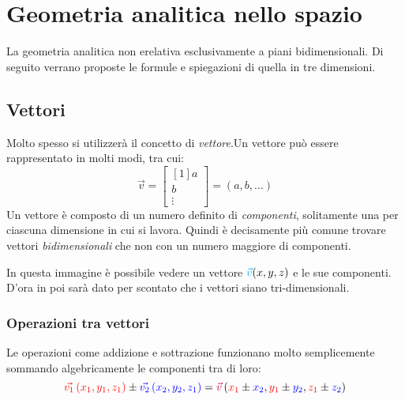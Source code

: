 
\section{Geometria analitica nello spazio}
La geometria analitica non erelativa esclusivamente a piani bidimensionali. Di seguito verrano 
proposte le formule e spiegazioni di quella in tre dimensioni.
\subsection{Vettori}
Molto spesso si utilizzerà il concetto di \emph{vettore}.Un vettore può essere rappresentato in 
molti modi, tra cui:
\begin{equation*}
  \vec{v} = 
  \begin{bmatrix}[1]
    a\\b\\\vdots
  \end{bmatrix} = 
  (a, b, \dots)
\end{equation*}
Un vettore è composto di un numero definito di \emph{componenti}, solitamente una per ciascuna
dimensione in cui si lavora. Quindi è decisamente più comune trovare vettori \emph{bidimensionali}
che non con un numero maggiore di componenti.
\begin{center}
\end{center}
In questa immagine è possibile vedere un vettore $\mathcolor{cyan}{\vec{v}}(x,y,z)$ e le sue 
componenti.\\[\baselineskip]
D'ora in poi sarà dato per scontato che i vettori siano tri-dimensionali.

\subsubsection{Operazioni tra vettori}
Le operazioni come addizione e sottrazione funzionano molto semplicemente sommando algebricamente
le componenti tra di loro:
\begin{equation*}
  \mathcolor{red}{\vec{v_1}\left(x_1, y_1, z_1\right)} \pm 
  \mathcolor{blue}{\vec{v_2}\left(x_2, y_2, z_1\right)} = 
  \mathcolor{purple}{\vec{v}}\left(\mathcolor{red}{x_1}\pm \mathcolor{blue}{x_2}, 
  \mathcolor{red}{y_1}\pm \mathcolor{blue}{y_2},
  \mathcolor{red}{z_1}\pm \mathcolor{blue}{z_2}\right)
\end{equation*}

